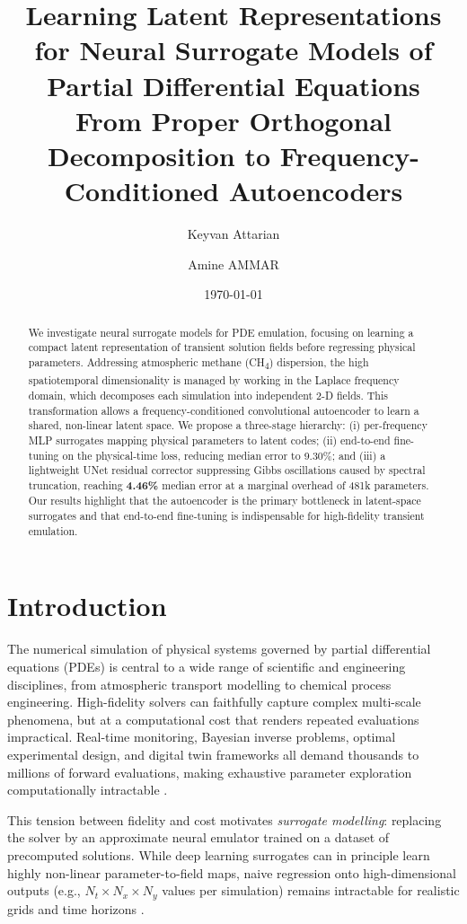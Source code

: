 \documentclass[a4paper, twocolumn]{article}
\author{Keyvan Attarian \and Amine AMMAR}
\date{\today}
\title{Learning Latent Representations for Neural Surrogate Models of Partial Differential Equations \\ \vspace{0.5em} \large From Proper Orthogonal Decomposition to Frequency-Conditioned Autoencoders}
\begin{document}
\maketitle

\begin{abstract}
We investigate neural surrogate models for PDE emulation, focusing on learning a compact latent representation of transient solution fields before regressing physical parameters. Addressing atmospheric methane (CH\textsubscript{4}) dispersion, the high spatiotemporal dimensionality is managed by working in the Laplace frequency domain, which decomposes each simulation into independent 2-D fields. This transformation allows a frequency-conditioned convolutional autoencoder to learn a shared, non-linear latent space. We propose a three-stage hierarchy: (i) per-frequency MLP surrogates mapping physical parameters to latent codes; (ii) end-to-end fine-tuning on the physical-time loss, reducing median error to 9.30\%; and (iii) a lightweight UNet residual corrector suppressing Gibbs oscillations caused by spectral truncation, reaching \textbf{4.46\%} median error at a marginal overhead of 481k parameters. Our results highlight that the autoencoder is the primary bottleneck in latent-space surrogates and that end-to-end fine-tuning is indispensable for high-fidelity transient emulation.
\end{abstract}

\section{Introduction}
\label{sec:intro}

The numerical simulation of physical systems governed by partial differential equations (PDEs) is central to a wide range of scientific and engineering disciplines, from atmospheric transport modelling to chemical process engineering. High-fidelity solvers can faithfully capture complex multi-scale phenomena, but at a computational cost that renders repeated evaluations impractical. Real-time monitoring, Bayesian inverse problems, optimal experimental design, and digital twin frameworks all demand thousands to millions of forward evaluations, making exhaustive parameter exploration computationally intractable \cite{quarteroni2025}.

This tension between fidelity and cost motivates \emph{surrogate modelling}: replacing the solver by an approximate neural emulator trained on a dataset of precomputed solutions. While deep learning surrogates can in principle learn highly non-linear parameter-to-field maps, naive regression onto high-dimensional outputs (e.g., $N_t \times N_x \times N_y$ values per simulation) remains intractable for realistic grids and time horizons \cite{karniadakis2021}. 
\end{document}
